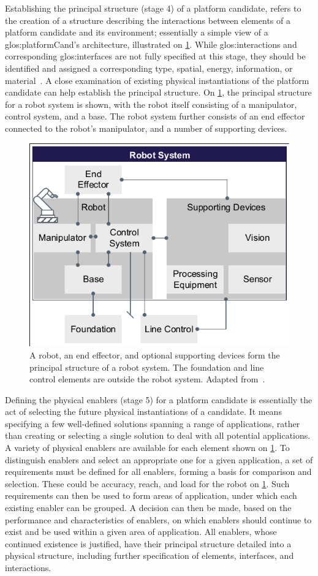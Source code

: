 Establishing the principal structure (stage 4) of a platform candidate, refers to the creation of a structure describing the interactions between elements of a platform candidate and its environment; essentially a simple view of a \gls{glos:platformCand}'s architecture, illustrated on \cref{fig:principStruct}.
While \gls{glos:interaction}s and corresponding \gls{glos:interface}s are not fully specified at this stage, they should be identified and assigned a corresponding type, \ie{} spatial, energy, information, or material~\parencite{Pimmler94integrationanalysis}.
A close examination of existing physical instantiations of the platform candidate can help establish the principal structure.
On \cref{fig:principStruct}, the principal structure for a robot system is shown, with the robot itself consisting of a manipulator, control system, and a base.
The robot system further consists of an end effector connected to the robot's manipulator, and a number of supporting devices.
\begin{figure}[tb]
  \centering
  \includegraphics[width=.5\textwidth, trim=2 2 2 2, clip]{mainmatter/researchResults/figures/principStruct.pdf}
  \caption[Principal structure of a robot system.]
  {A robot, an end effector, and optional supporting devices form the principal structure of a robot system.
  The foundation and line control elements are outside the robot system.
  Adapted from~\parencite{SorensenCMS2019}.}\label{fig:principStruct}
\end{figure}

Defining the physical enablers (stage 5) for a platform candidate is essentially the act of selecting the future physical instantiations of a candidate.
It means specifying a few well-defined solutions spanning a range of applications, rather than creating or selecting a single solution to deal with all potential applications.
A variety of physical enablers are available for each element shown on \cref{fig:principStruct}.
To distinguish enablers and select an appropriate one for a given application, a set of requirements must be defined for all enablers, forming a basis for comparison and selection.
These could be \eg{} accuracy, reach, and load for the robot on \cref{fig:principStruct}.
Such requirements can then be used to form areas of application, under which each existing enabler can be grouped.
A decision can then be made, based on the performance and characteristics of enablers, on which enablers should continue to exist and be used within a given area of application.
All enablers, whose continued existence is justified, have their principal structure detailed into a physical structure, including further specification of elements, interfaces, and interactions.

